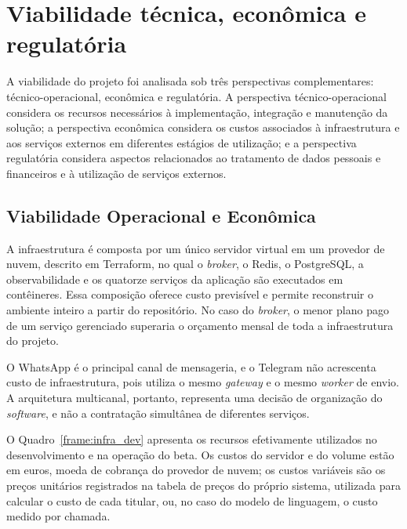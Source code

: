 \section{Viabilidade técnica, econômica e regulatória}

A viabilidade do projeto foi analisada sob três perspectivas complementares: técnico-operacional, econômica e regulatória. A perspectiva técnico-operacional considera os recursos necessários à implementação, integração e manutenção da solução; a perspectiva econômica considera os custos associados à infraestrutura e aos serviços externos em diferentes estágios de utilização; e a perspectiva regulatória considera aspectos relacionados ao tratamento de dados pessoais e financeiros e à utilização de serviços externos.

\subsection{Viabilidade Operacional e Econômica}

A infraestrutura é composta por um único servidor virtual em um provedor de nuvem, descrito em Terraform, no qual o \textit{broker}, o Redis, o PostgreSQL, a observabilidade e os quatorze serviços da aplicação são executados em contêineres. Essa composição oferece custo previsível e permite reconstruir o ambiente inteiro a partir do repositório. No caso do \textit{broker}, o menor plano pago de um serviço gerenciado superaria o orçamento mensal de toda a infraestrutura do projeto.

O WhatsApp é o principal canal de mensageria, e o Telegram não acrescenta custo de infraestrutura, pois utiliza o mesmo \textit{gateway} e o mesmo \textit{worker} de envio. A arquitetura multicanal, portanto, representa uma decisão de organização do \textit{software}, e não a contratação simultânea de diferentes serviços.

O Quadro~\ref{frame:infra_dev} apresenta os recursos efetivamente utilizados no desenvolvimento e na operação do beta. Os custos do servidor e do volume estão em euros, moeda de cobrança do provedor de nuvem; os custos variáveis são os preços unitários registrados na tabela de preços do próprio sistema, utilizada para calcular o custo de cada titular, ou, no caso do modelo de linguagem, o custo medido por chamada.

